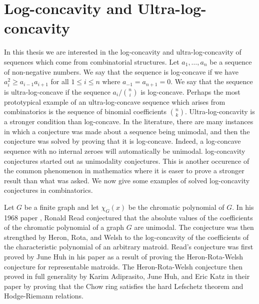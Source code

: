 \documentclass{puthesis-UG}
\begin{document}
\section{Log-concavity and Ultra-log-concavity}

In this thesis we are interested in the log-concavity and ultra-log-concavity of sequences which come from combinatorial structures. Let $a_1, \ldots, a_n$ be a sequence of non-negative numbers. We say that the sequence is log-concave if we have $a_i^2 \geq a_{i-1} a_{i+1}$ for all $1 \leq i \leq n$ where $a_{-1} = a_{n+1} = 0$. We say that the sequence is ultra-log-concave if the sequence $a_i / \binom{n}{i}$ is log-concave. Perhaps the most prototypical example of an ultra-log-concave sequence which arises from combinatorics is the sequence of binomial coefficients $\binom{n}{k}$. Ultra-log-concavity is a stronger condition than log-concave. In the literature, there are many instances in which a conjecture was made about a sequence being unimodal, and then the conjecture was solved by proving that it is log-concave. Indeed, a log-concave sequence with no internal zeroes will automatically be unimodal. log-concavity conjectures started out as unimodality conjectures. This is another occurence of the common phenomenon in mathematics where it is easer to prove a stronger result than what was asked. We now give some examples of solved log-concavity conjectures in combinatorics. 

\begin{example}
	Let $G$ be a finite graph and let $\chi_G(x)$ be the chromatic polynomial of $G$. In his 1968 paper \cite{Read-conjecture}, Ronald Read conjectured that the absolute values of the coefficients of the chromatic polynomial of a graph $G$ are unimodal. The conjecture was then strengthed by Heron, Rota, and Welsh to the log-concavity of the coefficients of the characteristic polynomial of an arbitrary matroid. Read's conjecture was first proved by June Huh in his paper \cite{milnor-numbers} as a result of proving the Heron-Rota-Welsh conjecture for representable matroids. The Heron-Rota-Welsh conjecture then proved in full generality by Karim Adiprasito, June Huh, and Eric Katz in their paper \cite{AHK} by proving that the Chow ring satisfies the hard Lefschetz theorem and Hodge-Riemann relations. 
\end{example}
\end{document}
